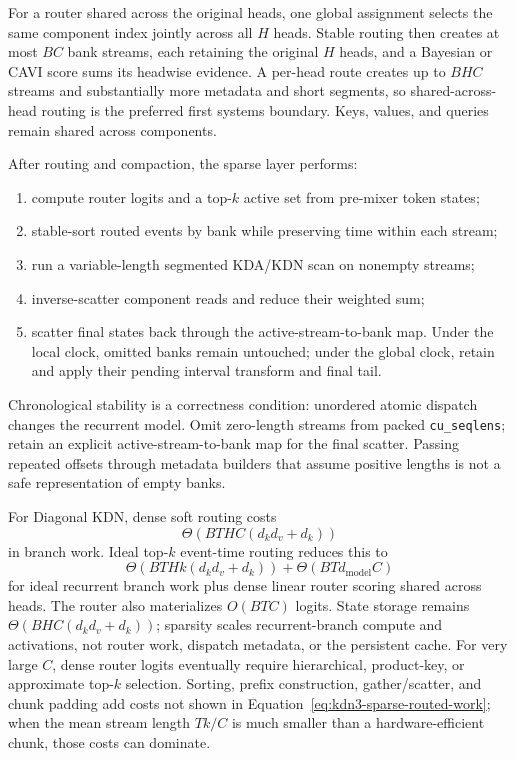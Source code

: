 \documentclass[11pt]{article}
\begin{document}
For a router shared across the original heads, one global assignment selects the same component
index jointly across all $H$ heads.  Stable routing then creates at most $BC$ bank streams, each
retaining the original $H$ heads, and a Bayesian or CAVI score sums its headwise evidence.  A
per-head route creates up to $BHC$ streams and substantially more metadata and short segments, so
shared-across-head routing is the preferred first systems boundary.  Keys, values, and queries
remain shared across components.

After routing and compaction, the sparse layer performs:
\begin{enumerate}
  \item compute router logits and a top-$k$ active set from pre-mixer token states;
  \item stable-sort routed events by bank while preserving time within each stream;
  \item run a variable-length segmented KDA/KDN scan on nonempty streams;
  \item inverse-scatter component reads and reduce their weighted sum;
  \item scatter final states back through the active-stream-to-bank map.  Under the local clock,
        omitted banks remain untouched; under the global clock, retain and apply their pending
        interval transform and final tail.
\end{enumerate}
Chronological stability is a correctness condition: unordered atomic dispatch changes the
recurrent model.  Omit zero-length streams from packed \texttt{cu\_seqlens}; retain an explicit
active-stream-to-bank map for the final scatter.  Passing repeated offsets through metadata
builders that assume positive lengths is not a safe representation of empty banks.

For Diagonal KDN, dense soft routing costs
\begin{equation}
  \Theta\!\left(
    BTHC(d_kd_v+d_k)
  \right)
  \label{eq:kdn3-dense-routed-work}
\end{equation}
in branch work.  Ideal top-$k$ event-time routing reduces this to
\begin{equation}
  \Theta\!\left(
    BTHk(d_kd_v+d_k)
  \right)
  +\Theta(BT d_{\mathrm{model}}C)
  \label{eq:kdn3-sparse-routed-work}
\end{equation}
for ideal recurrent branch work plus dense linear router scoring shared across heads.  The router also
materializes $O(BTC)$ logits.  State storage remains
$\Theta(BHC(d_kd_v+d_k))$; sparsity scales recurrent-branch compute and activations, not router
work, dispatch metadata, or the persistent cache.  For
very large $C$, dense router logits eventually require hierarchical, product-key, or approximate
top-$k$ selection.  Sorting, prefix construction, gather/scatter, and chunk padding add costs not
shown in Equation~\eqref{eq:kdn3-sparse-routed-work}; when the mean stream length $Tk/C$ is much
smaller than a hardware-efficient chunk, those costs can dominate.
\end{document}
